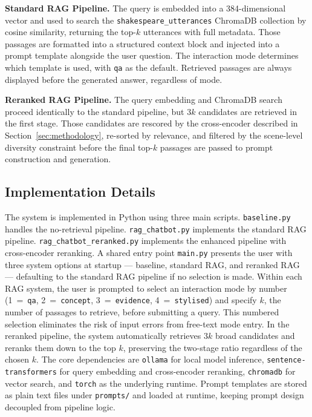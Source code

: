 \documentclass[10pt,conference]{IEEEtran}
\begin{document}
\textbf{Standard RAG Pipeline.}
The query is embedded into a 384-dimensional vector and used to search
the \texttt{shakespeare\_utterances} ChromaDB collection by cosine
similarity, returning the top-$k$ utterances with full metadata. Those
passages are formatted into a structured context block and injected into
a prompt template alongside the user question. The interaction mode
determines which template is used, with \texttt{qa} as the default.
Retrieved passages are always displayed before the generated answer,
regardless of mode.

\textbf{Reranked RAG Pipeline.}
The query embedding and ChromaDB search proceed identically to the
standard pipeline, but $3k$ candidates are retrieved in the first stage.
Those candidates are rescored by the cross-encoder described in
Section~\ref{sec:methodology}, re-sorted by relevance, and filtered by
the scene-level diversity constraint before the final top-$k$ passages
are passed to prompt construction and generation.

\subsection{Implementation Details}
The system is implemented in Python using three main scripts.
\texttt{baseline.py} handles the no-retrieval pipeline.
\texttt{rag\_chatbot.py} implements the standard RAG pipeline.
\texttt{rag\_chatbot\_reranked.py} implements the enhanced pipeline with
cross-encoder reranking. A shared entry point \texttt{main.py} presents
the user with three system options at startup --- baseline, standard RAG,
and reranked RAG --- defaulting to the standard RAG pipeline if no
selection is made. Within each RAG system, the user is prompted to select
an interaction mode by number (1~=~\texttt{qa}, 2~=~\texttt{concept},
3~=~\texttt{evidence}, 4~=~\texttt{stylised}) and specify $k$, the number
of passages to retrieve, before submitting a query. This numbered
selection eliminates the risk of input errors from free-text mode entry.
In the reranked pipeline, the system automatically retrieves $3k$ broad
candidates and reranks them down to the top $k$, preserving the two-stage
ratio regardless of the chosen $k$.
The core dependencies are \texttt{ollama} for local model inference,
\texttt{sentence-transformers} for query embedding and cross-encoder
reranking, \texttt{chromadb} for vector search, and \texttt{torch} as
the underlying runtime. Prompt templates are stored as plain text files
under \texttt{prompts/} and loaded at runtime, keeping prompt design
decoupled from pipeline logic.
\end{document}
